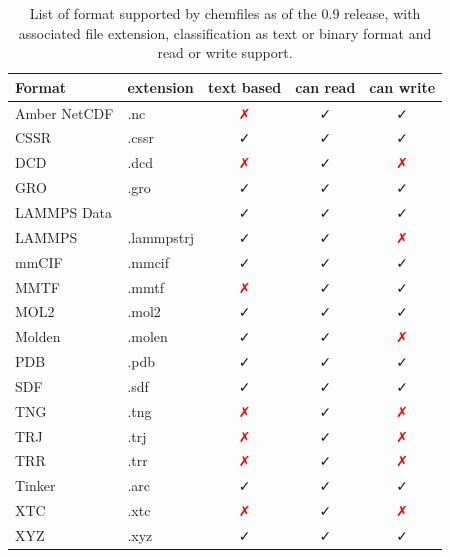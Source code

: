 \documentclass[thesis]{subfiles}
\begin{document}
\begin{table}[ht]
    \centering
    \caption{List of format supported by chemfiles as of the 0.9 release, with
    associated file extension, classification as text or binary format and
    read or write support.}
    \label{tab:chemfiles:formats}
    \def\nope{\textcolor{red}{✗}}
    \def\yep{\textcolor{webgreen}{✓}}
    \begin{tabular}{l l c c c}
        \toprule
        Format                         & extension & text based & can read & can write \\
        \midrule
        Amber NetCDF\cite{AmberNetCDF} & .nc       & \nope      &  \yep    & \yep   \\
        CSSR                           & .cssr     & \yep       &  \yep    & \yep   \\
        DCD                            & .dcd      & \nope      &  \yep    & \nope  \\
        GRO                            & .gro      & \yep       &  \yep    & \yep   \\
        LAMMPS Data                    &           & \yep       &  \yep    & \yep   \\
        LAMMPS                         &.lammpstrj & \yep       &  \yep    & \nope  \\
        mmCIF\cite{Bourne1997}         & .mmcif    & \yep       &  \yep    & \yep   \\
        MMTF\cite{Bradley2017}         & .mmtf     & \nope      &  \yep    & \yep   \\
        MOL2                           & .mol2     & \yep       &  \yep    & \yep   \\
        Molden                         & .molen    & \yep       &  \yep    & \nope  \\
        PDB\cite{Berman2003}           & .pdb      & \yep       &  \yep    & \yep   \\
        SDF                            & .sdf      & \yep       &  \yep    & \yep   \\
        TNG\cite{Lundborg2013}         & .tng      & \nope      &  \yep    & \nope  \\
        TRJ                            & .trj      & \nope      &  \yep    & \nope  \\
        TRR                            & .trr      & \nope      &  \yep    & \nope  \\
        Tinker                         & .arc      & \yep       &  \yep    & \yep   \\
        XTC                            & .xtc      & \nope      &  \yep    &\nope   \\
        XYZ                            & .xyz      & \yep       &  \yep    & \yep   \\
        \bottomrule
    \end{tabular}
\end{table}
\end{document}
